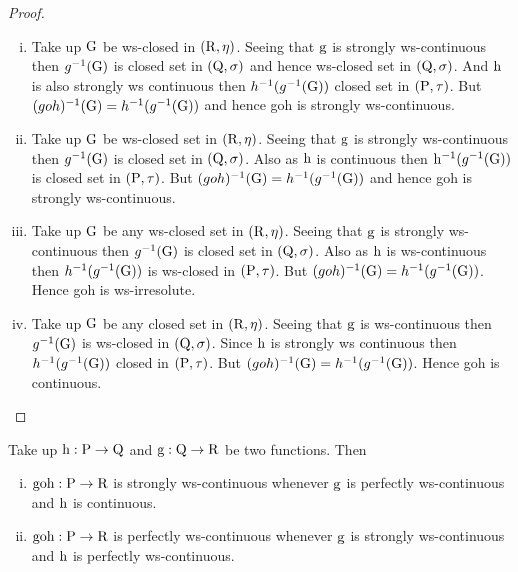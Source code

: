 \begin{proof}
\begin{enumerate}[(i)]
\item Take up $\mathrm{G}$ be ws-closed in $(\mathrm{R},\eta)$. Seeing that $\mathrm{g}$ is strongly ws-continuous then $g^{-1}(\mathrm{G})$ is closed set in $(\mathrm{Q},\sigma)$ and hence ws-closed set in $(\mathrm{Q},\sigma)$. And $\mathrm{h}$ is also strongly ws continuous then $h^{-1} (g^{-1}(\mathrm{G}))$ closed set in $(\mathrm{P},\tau)$. But $(goh)^{-1}(\mathrm{G}) =h^{-1}(g^{-1}(\mathrm{G}))$ and hence goh is strongly ws-continuous.

\item Take up $\mathrm{G}$ be ws-closed set in $(\mathrm{R},\eta)$. Seeing that $\mathrm{g}$ is strongly ws-continuous then $g^{-1}(\mathrm{G})$ is closed set in $(\mathrm{Q},\sigma)$. Also as $\mathrm{h}$ is continuous then $\mathrm{h}^{-1}(g^{-1}(\mathrm{G}))$ is closed set in $(\mathrm{P},\tau)$. But $(goh)^{-1}(\mathrm{G}) = h^{-1} (g^{-1} (\mathrm{G}))$ and hence goh is strongly ws-continuous.

\item Take up $\mathrm{G}$ be any ws-closed set in $(\mathrm{R}, \eta)$. Seeing that $\mathrm{g}$ is strongly ws-continuous then $g^{-1}(\mathrm{G})$ is closed set in $(\mathrm{Q},\sigma)$. Also as $\mathrm{h}$ is ws-continuous then $h^{-1}(g^{-1}(\mathrm{G}))$ is ws-closed in $(\mathrm{P},\tau )$. But $(goh)^{-1}(\mathrm{G}) = h^{-1}(g^{-1}(\mathrm{G}))$. Hence goh is ws-irresolute.

\item Take up $\mathrm{G}$ be any closed set in $(\mathrm{R},\eta)$. Seeing that $\mathrm{g}$ is ws-continuous then $g^{-1} (\mathrm{G})$ is ws-closed in $(\mathrm{Q},\sigma)$. Since $\mathrm{h}$ is strongly ws continuous then $h^{-1} (g^{-1}(\mathrm{G}))$ closed in $(\mathrm{P},\tau)$. But $(goh)^{-1}(\mathrm{G}) = h^{-1} (g^{-1}(\mathrm{G}))$. Hence goh is continuous.
\end{enumerate}
\end{proof}

\begin{thm}\label{thm3.3.21}
Take up $\mathrm{h}: \mathrm{P}\to \mathrm{Q}$ and $\mathrm{g}: \mathrm{Q}\to  \mathrm{R}$ be two functions. Then
\begin{enumerate}[(i)]
\item $\text{goh}: \mathrm{P}\to \mathrm{R}$ is strongly ws-continuous whenever $\mathrm{g}$ is perfectly ws-continuous and $\mathrm{h}$ is continuous.
\item $\text{goh}: \mathrm{P}\to \mathrm{R}$ is perfectly ws-continuous whenever $\mathrm{g}$ is strongly ws-continuous and $\mathrm{h}$ is perfectly ws-continuous.
\end{enumerate}
\end{thm}


